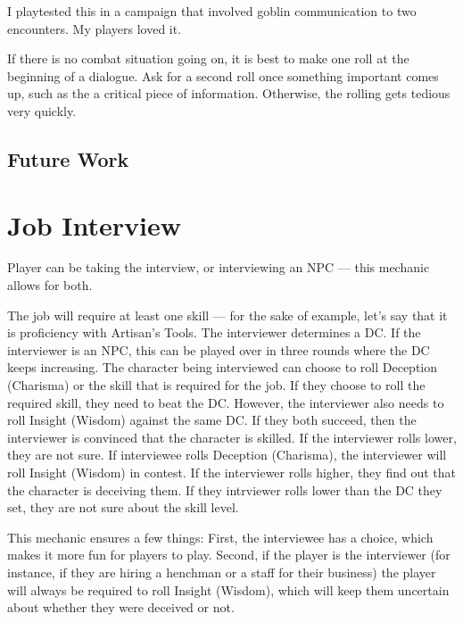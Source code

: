 \documentclass[twocolumn]{dndbook}
\begin{document}
I playtested this in a campaign that involved goblin communication to two encounters. My players loved it.\par

If there is no combat situation going on, it is best to make one roll at the beginning of a dialogue.
Ask for a second roll once something important comes up, such as the a critical piece of information.
Otherwise, the rolling gets tedious very quickly.

\subsection{Future Work}





\section{Job Interview}
\label{sec:job_interview}

Player can be taking the interview, or interviewing an NPC --- this mechanic allows for both.\par

The job will require at least one skill --- for the sake of example, let's say that it is proficiency with Artisan's Tools.
The interviewer determines a DC. If the interviewer is an NPC, this can be played over in three rounds where the DC keeps increasing.
The character being interviewed can choose to roll Deception (Charisma) or the skill that is required for the job.
If they choose to roll the required skill, they need to beat the DC. However, the interviewer also needs to roll Insight (Wisdom) against the same DC.
If they both succeed, then the interviewer is convinced that the character is skilled.
If the interviewer rolls lower, they are not sure.
If interviewee rolls Deception (Charisma), the interviewer will roll Insight (Wisdom) in contest.
If the interviewer rolls higher, they find out that the character is deceiving them.
If they intrviewer rolls lower than the DC they set, they are not sure about the skill level.\par

This mechanic ensures a few things: First, the interviewee has a choice, which makes it more fun for players to play.
Second, if the player is the interviewer (for instance, if they are hiring a henchman or a staff for their business)
the player will always be required to roll Insight (Wisdom), which will keep them uncertain about whether they were deceived or not.\par
\end{document}
